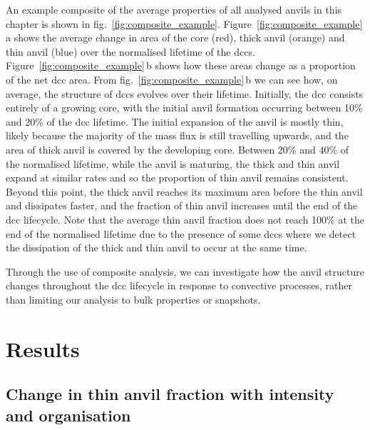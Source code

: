 An example composite of the average properties of all analysed anvils in this chapter is shown in fig.~\ref{fig:composite_example}.
Figure~\ref{fig:composite_example}\,a shows the average change in area of the core (red), thick anvil (orange) and thin anvil (blue) over the normalised lifetime of the \acrshort{dcc}s.
Figure~\ref{fig:composite_example}\,b shows how these areas change as a proportion of the net \acrshort{dcc} area.
From fig.~\ref{fig:composite_example}\,b we can see how, on average, the structure of \acrshort{dcc}s evolves over their lifetime.
Initially, the \acrshort{dcc} consists entirely of a growing core, with the initial anvil formation occurring between 10\% and 20\% of the \acrshort{dcc} lifetime.
The initial expansion of the anvil is mostly thin, likely because the majority of the mass flux is still travelling upwards, and the area of thick anvil is covered by the developing core.
Between 20\% and 40\% of the normalised lifetime, while the anvil is maturing, the thick and thin anvil expand at similar rates and so the proportion of thin anvil remains consistent.
Beyond this point, the thick anvil reaches its maximum area before the thin anvil and dissipates faster, and the fraction of thin anvil increases until the end of the \acrshort{dcc} lifecycle.
Note that the average thin anvil fraction does not reach 100\% at the end of the normalised lifetime due to the presence of some \acrshort{dcc}s where we detect the dissipation of the thick and thin anvil to occur at the same time.

Through the use of composite analysis, we can investigate how the anvil structure changes throughout the \acrshort{dcc} lifecycle in response to convective processes, rather than limiting our analysis to bulk properties or snapshots.

\section{Results}

\subsection{Change in thin anvil fraction with intensity and organisation}

